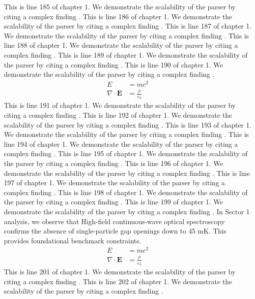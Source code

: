 This is line 185 of chapter 1. We demonstrate the scalability of the parser by citing a complex finding \cite{ref1_185}.
This is line 186 of chapter 1. We demonstrate the scalability of the parser by citing a complex finding \cite{ref1_186}.
This is line 187 of chapter 1. We demonstrate the scalability of the parser by citing a complex finding \cite{ref1_187}.
This is line 188 of chapter 1. We demonstrate the scalability of the parser by citing a complex finding \cite{ref1_188}.
This is line 189 of chapter 1. We demonstrate the scalability of the parser by citing a complex finding \cite{ref1_189}.
This is line 190 of chapter 1. We demonstrate the scalability of the parser by citing a complex finding \cite{ref1_190}.
\begin{align*}
  E &= mc^2 \\
  \nabla \cdot \mathbf{E} &= \frac{\rho}{\varepsilon_0}
\end{align*}
This is line 191 of chapter 1. We demonstrate the scalability of the parser by citing a complex finding \cite{ref1_191}.
This is line 192 of chapter 1. We demonstrate the scalability of the parser by citing a complex finding \cite{ref1_192}.
This is line 193 of chapter 1. We demonstrate the scalability of the parser by citing a complex finding \cite{ref1_193}.
This is line 194 of chapter 1. We demonstrate the scalability of the parser by citing a complex finding \cite{ref1_194}.
This is line 195 of chapter 1. We demonstrate the scalability of the parser by citing a complex finding \cite{ref1_195}.
This is line 196 of chapter 1. We demonstrate the scalability of the parser by citing a complex finding \cite{ref1_196}.
This is line 197 of chapter 1. We demonstrate the scalability of the parser by citing a complex finding \cite{ref1_197}.
This is line 198 of chapter 1. We demonstrate the scalability of the parser by citing a complex finding \cite{ref1_198}.
This is line 199 of chapter 1. We demonstrate the scalability of the parser by citing a complex finding \cite{ref1_199}.
In Sector 1 analysis, we observe that High-field continuous-wave optical spectroscopy confirms the absence of single-particle gap openings down to 45 mK. This provides foundational benchmark constraints.
\begin{align*}
  E &= mc^2 \\
  \nabla \cdot \mathbf{E} &= \frac{\rho}{\varepsilon_0}
\end{align*}
This is line 201 of chapter 1. We demonstrate the scalability of the parser by citing a complex finding \cite{ref1_201}.
This is line 202 of chapter 1. We demonstrate the scalability of the parser by citing a complex finding \cite{ref1_202}.
